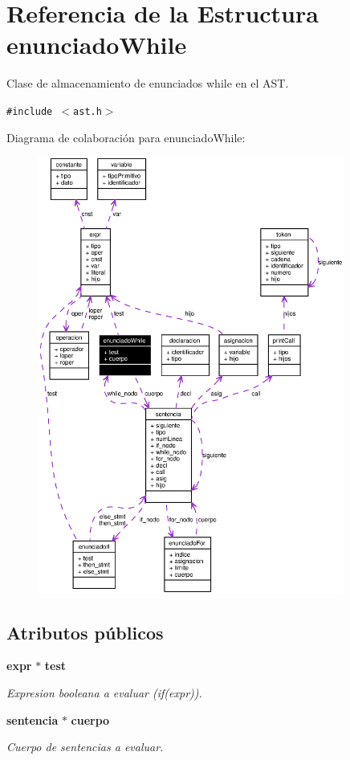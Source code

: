 \section{Referencia de la Estructura enunciado\-While}
\label{structenunciadoWhile}
Clase de almacenamiento de enunciados while en el AST.  


{\tt \#include $<$ast.h$>$}

Diagrama de colaboraci\'{o}n para enunciado\-While:\begin{figure}[H]
\begin{center}
\leavevmode
\includegraphics[width=285pt]{structenunciadoWhile__coll__graph}
\end{center}
\end{figure}
\subsection*{Atributos p\'{u}blicos}
\begin{CompactItemize}
\item 
{\bf expr} $\ast$ {\bf test}
\begin{CompactList}\small\item\em Expresion booleana a evaluar (if(expr)). \item\end{CompactList}\item 
{\bf sentencia} $\ast$ {\bf cuerpo}
\begin{CompactList}\small\item\em Cuerpo de sentencias a evaluar. \item\end{CompactList}\end{CompactItemize}


